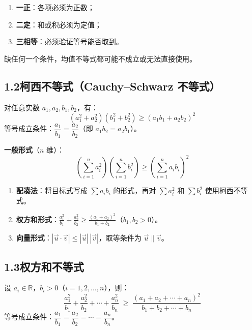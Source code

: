 \documentclass[12pt, a4paper]{ctexart}
\begin{document}
\begin{warnbox}
\begin{enumerate}[label=(\arabic*)]
  \item \textbf{一正}：各项必须为正数；
  \item \textbf{二定}：和或积必须为定值；
  \item \textbf{三相等}：必须验证等号能否取到。
\end{enumerate}
缺任何一个条件，均值不等式都可能不成立或无法直接使用。
\end{warnbox}

\subsection*{1.2\quad 柯西不等式（Cauchy--Schwarz 不等式）}

\begin{knowledgebox}
对任意实数 $a_1,a_2,b_1,b_2$，有：
\[
(a_1^2+a_2^2)(b_1^2+b_2^2) \geqslant (a_1 b_1+a_2 b_2)^2
\]
等号成立条件：$\dfrac{a_1}{b_1}=\dfrac{a_2}{b_2}$（即 $a_1 b_2 = a_2 b_1$）。

\medskip
\textbf{一般形式}（$n$ 维）：
\[
\left(\sum_{i=1}^{n} a_i^2\right)\left(\sum_{i=1}^{n} b_i^2\right) \geqslant \left(\sum_{i=1}^{n} a_i b_i\right)^2
\]
\end{knowledgebox}

\begin{tipbox}[柯西不等式的常用技巧]
\begin{enumerate}[label=(\arabic*)]
  \item \textbf{配凑法}：将目标式写成 $\sum a_i b_i$ 的形式，再对 $\sum a_i^2$ 和 $\sum b_i^2$ 使用柯西不等式。
  \item \textbf{权方和形式}：$\displaystyle\frac{a_1^2}{b_1}+\frac{a_2^2}{b_2} \geqslant \frac{(a_1+a_2)^2}{b_1+b_2}$（$b_1,b_2>0$）。
  \item \textbf{向量形式}：$|\vec{u}\cdot\vec{v}| \leqslant |\vec{u}|\,|\vec{v}|$，取等条件为 $\vec{u} \parallel \vec{v}$。
\end{enumerate}
\end{tipbox}

\subsection*{1.3\quad 权方和不等式}

\begin{knowledgebox}
设 $a_i \in \mathbb{R}$，$b_i > 0$（$i=1,2,\ldots,n$），则：
\[
\frac{a_1^2}{b_1}+\frac{a_2^2}{b_2}+\cdots+\frac{a_n^2}{b_n}
\;\geqslant\;
\frac{(a_1+a_2+\cdots+a_n)^2}{b_1+b_2+\cdots+b_n}
\]
等号成立条件：$\dfrac{a_1}{b_1}=\dfrac{a_2}{b_2}=\cdots=\dfrac{a_n}{b_n}$。
\end{knowledgebox}
\end{document}
